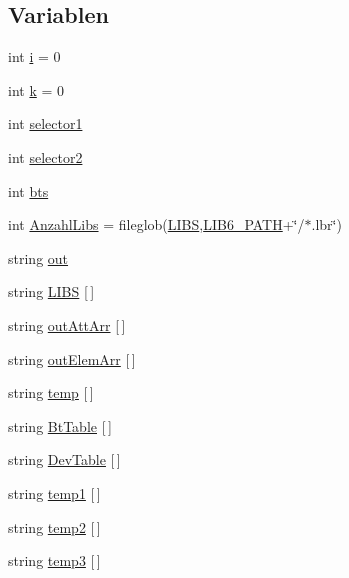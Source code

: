 \subsection*{Variablen}
\begin{DoxyCompactItemize}
\item 
int \hyperlink{libsearch_8ulp_acb559820d9ca11295b4500f179ef6392}{i} = 0
\item 
int \hyperlink{libsearch_8ulp_ab66ed8e0098c0a86b458672a55a9cca9}{k} = 0
\item 
int \hyperlink{libsearch_8ulp_a2f0524c519c9a079ebbe76797552cfff}{selector1}
\item 
int \hyperlink{libsearch_8ulp_acb22ea06df7a98062b750ecca56f1628}{selector2}
\item 
int \hyperlink{libsearch_8ulp_a00c6cb851706bdde7570b25efe80733a}{bts}
\item 
int \hyperlink{libsearch_8ulp_ae8b208e90c3b4ab20d7c823612b1a0f7}{Anzahl\+Libs} = fileglob(\hyperlink{test_8ulp_ab79ee21fe4aae7937f99de5b9c7b7d2c}{L\+I\+B\+S},\hyperlink{test_8ulp_a44dc1eefd5382033cf032f578a0130b9}{L\+I\+B6\+\_\+\+P\+A\+T\+H}+\char`\"{}/$\ast$.lbr\char`\"{})
\item 
string \hyperlink{libsearch_8ulp_a43b9274914173cbec050c89b07f1824b}{out}
\item 
string \hyperlink{libsearch_8ulp_ab79ee21fe4aae7937f99de5b9c7b7d2c}{L\+I\+B\+S} \mbox{[}$\,$\mbox{]}
\item 
string \hyperlink{libsearch_8ulp_a801e8dfc827f7961b6012c0100f77ab4}{out\+Att\+Arr} \mbox{[}$\,$\mbox{]}
\item 
string \hyperlink{libsearch_8ulp_abd552ace971c34ee4d05fc524378dc32}{out\+Elem\+Arr} \mbox{[}$\,$\mbox{]}
\item 
string \hyperlink{libsearch_8ulp_a2f8d954bdd72eba003a9802a6248de83}{temp} \mbox{[}$\,$\mbox{]}
\item 
string \hyperlink{libsearch_8ulp_af0d191df3e333660839f50e87bc098c8}{Bt\+Table} \mbox{[}$\,$\mbox{]}
\item 
string \hyperlink{libsearch_8ulp_a44f73a7606acf532b5a5c0eb0aef6fbc}{Dev\+Table} \mbox{[}$\,$\mbox{]}
\item 
string \hyperlink{libsearch_8ulp_a1739e013da948312edaaa3ade1bd7f7a}{temp1} \mbox{[}$\,$\mbox{]}
\item 
string \hyperlink{libsearch_8ulp_a93cd3f3f743b20e134149e06efa22a88}{temp2} \mbox{[}$\,$\mbox{]}
\item 
string \hyperlink{libsearch_8ulp_a6d07a7b1d2f2bb3e3061eba3b676dd44}{temp3} \mbox{[}$\,$\mbox{]}

\end{DoxyCompactItemize}
